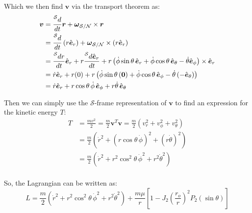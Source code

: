 \documentclass[titlepage]{article}
\begin{document}
Which we then find $\boldsymbol{v}$ via the transport theorem as:
\begin{equation}
	\begin{split}
		\boldsymbol{v}&=\frac{\prescript{\mathcal{S}}{}{d}}{dt}\boldsymbol{r}+\boldsymbol{\omega}_{\mathcal{S}/\mathcal{N}}\times\boldsymbol{r} \\
		&=\frac{\prescript{\mathcal{S}}{}{d}}{dt}\left(r\hat{\boldsymbol{e}}_r\right)+\boldsymbol{\omega}_{\mathcal{S}/\mathcal{N}}\times\left(r\hat{\boldsymbol{e}}_r\right) \\
		&=\frac{\prescript{\mathcal{S}}{}{d}r}{dt}\hat{\boldsymbol{e}}_r+r\frac{\prescript{\mathcal{S}}{}{d}\hat{\boldsymbol{e}}_r}{dt}+r\left(\dot{\phi}\sin\theta\,\hat{\boldsymbol{e}}_r+\dot{\phi}\cos\theta\,\hat{\boldsymbol{e}}_\theta-\dot{\theta}\hat{\boldsymbol{e}}_\phi\right)\times\hat{\boldsymbol{e}}_r \\
		&=\dot{r}\hat{\boldsymbol{e}}_r+r(0)+r\left(\dot{\phi}\sin\theta\,(\boldsymbol{0})+\dot{\phi}\cos\theta\,\hat{\boldsymbol{e}}_\phi-\dot{\theta}\left(-\hat{\boldsymbol{e}}_\theta\right)\right) \\
		&=\dot{r}\hat{\boldsymbol{e}}_r+r\cos\theta\,\dot{\phi}\,\hat{\boldsymbol{e}}_\phi+r\dot{\theta}\,\hat{\boldsymbol{e}}_\theta
	\end{split}
	\label{eq:velocity}
\end{equation}

Then we can simply use the $\mathcal{S}$-frame representation of $\boldsymbol{v}$ to find an expression for the kinetic energy $T$:
\begin{equation}
	\begin{split}
		T&=\frac{mv^2}{2}=\frac{m}{2}\boldsymbol{v}^T\boldsymbol{v}=\frac{m}{2}(v_r^2+v_\phi^2+v_\theta^2) \\
		&=\frac{m}{2}\left(\dot{r}^2+(r\cos\theta\,\dot{\phi})^2+(r\dot{\theta})^2\right) \\
		&=\frac{m}{2}\left(\dot{r}^2+r^2\cos^2\theta\,\dot{\phi}^2+r^2\dot{\theta}^2\right) \\
	\end{split}
	\label{eq:kineticeval}
\end{equation}

So, the Lagrangian can be written as:
\begin{equation}
	L=\frac{m}{2}\left(\dot{r}^2+r^2\cos^2\theta\,\dot{\phi}^2+r^2\dot{\theta}^2\right)+\frac{m\mu}{r}\left[1-J_2\left(\frac{r_o}{r}\right)^2P_2(\sin\theta)\right]
\end{equation}
\end{document}
